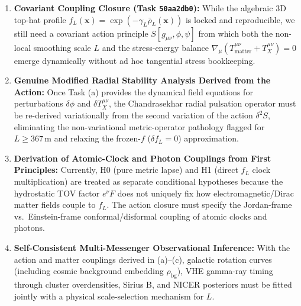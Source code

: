 \begin{enumerate}\setlength{\itemsep}{1.5pt}\setlength{\parskip}{0pt}\setlength{\topsep}{1pt}
  \item[\textbf{(a)}] \textbf{Covariant Coupling Closure (Task \texttt{50aa2db0}):} While the algebraic 3D top-hat profile $f_L(\mathbf{x}) = \exp(-\gamma_L\bar{\rho}_L(\mathbf{x}))$ is locked and reproducible, we still need a covariant action principle $S[g_{\mu\nu},\phi,\psi]$ from which both the non-local smoothing scale $L$ and the stress-energy balance $\nabla_\mu(T^{\mu\nu}_{\text{matter}} + T^{\mu\nu}_X) = 0$ emerge dynamically without ad hoc tangential stress bookkeeping.
  \item[\textbf{(b)}] \textbf{Genuine Modified Radial Stability Analysis Derived from the Action:} Once Task (a) provides the dynamical field equations for perturbations $\delta\phi$ and $\delta T^{\mu\nu}_X$, the Chandrasekhar radial pulsation operator must be re-derived variationally from the second variation of the action $\delta^2 S$, eliminating the non-variational metric-operator pathology flagged for $L \ge 367\,\text{m}$ and relaxing the frozen-$f$ ($\delta f_L = 0$) approximation.
  \item[\textbf{(c)}] \textbf{Derivation of Atomic-Clock and Photon Couplings from First Principles:} Currently, H0 (pure metric lapse) and H1 (direct $f_L$ clock multiplication) are treated as separate conditional hypotheses because the hydrostatic TOV factor $e^\nu F$ does not uniquely fix how electromagnetic/Dirac matter fields couple to $f_L$. The action closure must specify the Jordan-frame vs.\ Einstein-frame conformal/disformal coupling of atomic clocks and photons.
  \item[\textbf{(d)}] \textbf{Self-Consistent Multi-Messenger Observational Inference:} With the action and matter couplings derived in (a)--(c), galactic rotation curves (including cosmic background embedding $\rho_{\text{bg}}$), VHE gamma-ray timing through cluster overdensities, Sirius B, and NICER posteriors must be fitted jointly with a physical scale-selection mechanism for $L$.
\end{enumerate}

